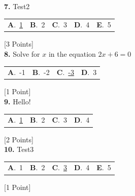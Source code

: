 \documentclass[12pt]{article}
\newcommand{\choice}[2]{\textbf{#1}.~#2}
\begin{document}
\noindent \textbf{\textenglish{7.}} {\textenglish{Test2}}

\begin{tabularx}{\linewidth}{@{}*{5}{Y}@{}}
\choice{A}{{\underline{{\textenglish{1}}}}} & \choice{B}{{{\textenglish{2}}}} & \choice{C}{{{\textenglish{3}}}} & \choice{D}{{{\textenglish{4}}}} & \choice{E}{{{\textenglish{5}}}} \\
\end{tabularx}
\hfill {\textenglish{[3 Points]}}\\[0.5em]

\noindent \textbf{\textenglish{8.}} {\textenglish{Solve for }}\(x \){\textenglish{ in the equation }}\(2x+6 = 0 \)

\begin{tabularx}{\linewidth}{@{}*{4}{Y}@{}}
\choice{A}{{{\textenglish{-1}}}} & \choice{B}{{{\textenglish{-2}}}} & \choice{C}{{\underline{{\textenglish{-3}}}}} & \choice{D}{{{\textenglish{3}}}} \\
\end{tabularx}
\hfill {\textenglish{[1 Point]}}\\[0.5em]

\noindent \textbf{\textenglish{9.}} {\textenglish{Hello!}}

\begin{tabularx}{\linewidth}{@{}*{4}{Y}@{}}
\choice{A}{{\underline{{\textenglish{1}}}}} & \choice{B}{{{\textenglish{2}}}} & \choice{C}{{{\textenglish{3}}}} & \choice{D}{{{\textenglish{4}}}} \\
\end{tabularx}
\hfill {\textenglish{[2 Points]}}\\[0.5em]

\noindent \textbf{\textenglish{10.}} {\textenglish{Test3}}

\begin{tabularx}{\linewidth}{@{}*{5}{Y}@{}}
\choice{A}{{{\textenglish{1}}}} & \choice{B}{{{\textenglish{2}}}} & \choice{C}{{\underline{{\textenglish{3}}}}} & \choice{D}{{{\textenglish{4}}}} & \choice{E}{{{\textenglish{5}}}} \\
\end{tabularx}
\hfill {\textenglish{[1 Point]}}\\[0.5em]
\end{document}
